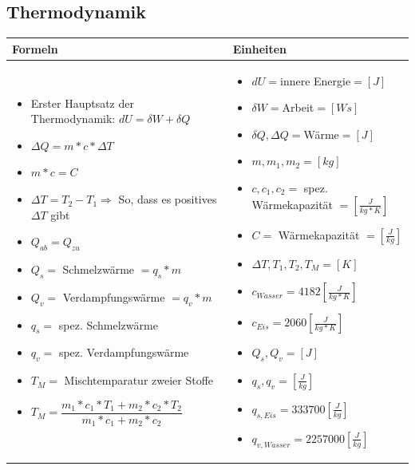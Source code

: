 \subsection{Thermodynamik}				%
\begin{table}[h!]
	\begin{center}
	\begin{tabular}{ | m{10cm} | m{8cm}  | }
		\hline
		Formeln & Einheiten \\ \hline
		\midrule
		\begin{itemize}
			\item Erster Hauptsatz der Thermodynamik: $dU=\delta W+\delta Q$ 	
			\item $\Delta Q=m*c*\Delta T$
			\item $m*c=C$
			\item $\Delta T=T_{2}-T_{1}\Rightarrow$ {\color{red} So, dass es positives $\Delta T$ gibt}
			\item $Q_{ab}=Q_{zu}$
			\item $Q_{s}=$ Schmelzwärme $= q_{s}*m$ 	
			\item $Q_{v}=$ Verdampfungswärme $= q_{v}*m$
			\item $q_{s}=$ spez. Schmelzwärme
			\item $q_{v}=$ spez. Verdampfungswärme 	
			\item $T_{M}=$ Mischtemparatur zweier Stoffe
			\item $T_{M}=\dfrac{m_{1}*c_{1}*T_{1}+m_{2}*c_{2}*T_{2}}{m_{1}*c_{1}+m_{2}*c_{2}}$
		\end{itemize}
		&
		\begin{itemize}
			\item $dU=$innere Energie$=[J]$
			\item $\delta W=$Arbeit$=[Ws]$
			\item $\delta Q,\Delta Q=$Wärme$=[J]$
			\item $m,m_{1},m_{2}=[kg]$
			\item $c,c_{1},c_{2}=$ spez. Wärmekapazität $=[\frac{J}{kg*K}]$
			\item $C=$ Wärmekapazität $=[\frac{J}{kg}]$
			\item $\Delta T,T_{1},T_{2},T_{M}=[K]$
			\item $c_{Wasser}=4182[\frac{J}{kg*K}]$
			\item $c_{Eis}=2060[\frac{J}{kg*K}]$
			\item $Q_{s},Q_{v}=[J]$
			\item $q_{s},q_{v}=[\frac{J}{kg}]$
			\item $q_{s,Eis}=333700[\frac{J}{kg}]$
			\item $q_{v,Wasser}=2257000[\frac{J}{kg}]$
		\end{itemize}
		\\ \hline
	\end{tabular}
\end{center}
\end{table}

